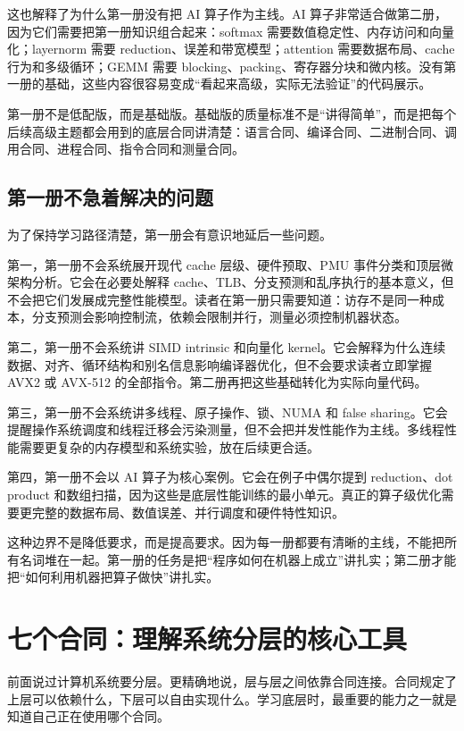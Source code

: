 这也解释了为什么第一册没有把 AI 算子作为主线。AI 算子非常适合做第二册，因为它们需要把第一册知识组合起来：softmax 需要数值稳定性、内存访问和向量化；layernorm 需要 reduction、误差和带宽模型；attention 需要数据布局、cache 行为和多级循环；GEMM 需要 blocking、packing、寄存器分块和微内核。没有第一册的基础，这些内容很容易变成“看起来高级，实际无法验证”的代码展示。

\begin{keyidea}
第一册不是低配版，而是基础版。基础版的质量标准不是“讲得简单”，而是把每个后续高级主题都会用到的底层合同讲清楚：语言合同、编译合同、二进制合同、调用合同、进程合同、指令合同和测量合同。
\end{keyidea}

\subsection{第一册不急着解决的问题}

为了保持学习路径清楚，第一册会有意识地延后一些问题。

第一，第一册不会系统展开现代 cache 层级、硬件预取、PMU 事件分类和顶层微架构分析。它会在必要处解释 cache、TLB、分支预测和乱序执行的基本意义，但不会把它们发展成完整性能模型。读者在第一册只需要知道：访存不是同一种成本，分支预测会影响控制流，依赖会限制并行，测量必须控制机器状态。

第二，第一册不会系统讲 SIMD intrinsic 和向量化 kernel。它会解释为什么连续数据、对齐、循环结构和别名信息影响编译器优化，但不会要求读者立即掌握 AVX2 或 AVX-512 的全部指令。第二册再把这些基础转化为实际向量代码。

第三，第一册不会系统讲多线程、原子操作、锁、NUMA 和 false sharing。它会提醒操作系统调度和线程迁移会污染测量，但不会把并发性能作为主线。多线程性能需要更复杂的内存模型和系统实验，放在后续更合适。

第四，第一册不会以 AI 算子为核心案例。它会在例子中偶尔提到 reduction、dot product 和数组扫描，因为这些是底层性能训练的最小单元。真正的算子级优化需要更完整的数据布局、数值误差、并行调度和硬件特性知识。

这种边界不是降低要求，而是提高要求。因为每一册都要有清晰的主线，不能把所有名词堆在一起。第一册的任务是把“程序如何在机器上成立”讲扎实；第二册才能把“如何利用机器把算子做快”讲扎实。

\section{七个合同：理解系统分层的核心工具}

前面说过计算机系统要分层。更精确地说，层与层之间依靠合同连接。合同规定了上层可以依赖什么，下层可以自由实现什么。学习底层时，最重要的能力之一就是知道自己正在使用哪个合同。

